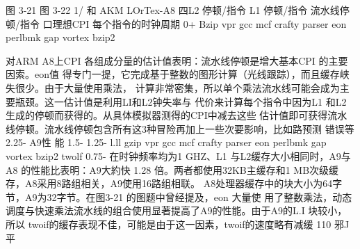 图 3-21
图 3-22
1/ 和 AKM LOrTex-A8
四L2 停顿/指令
L1 停顿/指令
流水线停顿/指令
口理想CPI
每个指令的时钟周期
0+
Bzip
vpr
gcc
mcf
crafty
parser
eon perlbmk gap
vortex bzip2

对ARM A8上CPI 各组成分量的估计值表明：流水线停顿是增大基本CPI 的主要因索。eon值
得专门一提，它完成基于整数的图形计算（光线跟踪），而且缓存峡失很少。由于大量使用乘法，
计算非常密集，所以单个乘法流水线可能会成为主要瓶颈。这一估计值是利用LI和L2钟失率与
代价来计算每个指令中因为L1 和L2生成的停顿而获得的。从具体模拟器测得的CPI中减去这些
估计值即可获得流水线停顿。流水线停顿包含所有这3种冒险再加上一些次要影响，比如路预测
错误等
2.25-
A9性
能
1.5-
1.25-
l.ll
gzip vpr gcc mcf crafty parser eon perlbmk gap vortex bzip2 twolf
0.75-
在时钟频率均为1 GHZ、L1 与L2缓存大小相同时，A9与A8 的性能比表明：A9大約快 1.28
倍。两者都使用32KB主缓存和1 MB次级缓存，A8采用8路组相关，A9使用16路组相联。
A8处理器缓存中的块大小为64字节，A9为32字节。在图3-21 的图题中曾经提及，eon 大量使
用了整数乘法，动态调度与快速乘法流水线的组合使用显著提高了A9的性能。由于A9的L.I
块较小，所以 twoif的缓存表现不佳，可能是由于这一因素，twoif的速度略有减缓
110
邪J平


